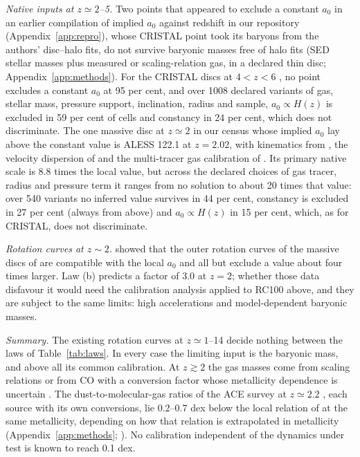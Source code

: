 \documentclass[fleqn,usenatbib]{mnras}
\begin{document}
\emph{Native inputs at $z\simeq2$--5.} Two points that appeared to exclude a constant $a_0$ in an earlier compilation of implied $a_0$ against redshift in our repository (Appendix~\ref{app:repro}), whose CRISTAL point took its baryons from the authors' disc--halo fits, do not survive baryonic masses free of halo fits (SED stellar masses plus measured or scaling-relation gas, in a declared thin disc; Appendix~\ref{app:methods}). For the CRISTAL discs at $4<z<6$ \citep{Lee2025}, no point excludes a constant $a_0$ at 95 per cent, and over 1008 declared variants of gas, stellar mass, pressure support, inclination, radius and sample, $a_0\propto H(z)$ is excluded in 59 per cent of cells and constancy in 24 per cent, which does not discriminate. The one massive disc at $z\simeq2$ in our census whose implied $a_0$ lay above the constant value is ALESS 122.1 at $z=2.02$, with kinematics from \citet{Amvrosiadis2025}, the velocity dispersion of \citet{CalistroRivera2018} and the multi-tracer gas calibration of \citet{Dunne2022}. Its primary native scale is 8.8 times the local value, but across the declared choices of gas tracer, radius and pressure term it ranges from no solution to about 20 times that value: over 540 variants no inferred value survives in 44 per cent, constancy is excluded in 27 per cent (always from above) and $a_0\propto H(z)$ in 15 per cent, which, as for CRISTAL, does not discriminate.

\emph{Rotation curves at $z\sim2$.} \citet{Milgrom2017} showed that the outer rotation curves of the massive discs of \citet{Genzel2017} are compatible with the local $a_0$ and all but exclude a value about four times larger. Law (b) predicts a factor of 3.0 at $z=2$; whether those data disfavour it would need the calibration analysis applied to RC100 above, and they are subject to the same limits: high accelerations and model-dependent baryonic masses.

\emph{Summary.} The existing rotation curves at $z\simeq1$--14 decide nothing between the laws of Table~\ref{tab:laws}. In every case the limiting input is the baryonic mass, and above all its common calibration. At $z\gtrsim2$ the gas masses come from scaling relations \citep{Tacconi2018,Tacconi2020} or from CO with a conversion factor whose metallicity dependence is uncertain \citep{Bolatto2013}. The dust-to-molecular-gas ratios of the ACE survey at $z\simeq2.2$ \citep{Geesink2026}, each source with its own conversions, lie 0.2--0.7 dex below the local relation of \citet{Bertemes2018} at the same metallicity, depending on how that relation is extrapolated in metallicity (Appendix~\ref{app:methods}; \citealt{Zimmerman2026wall}). No calibration independent of the dynamics under test is known to reach 0.1 dex.
\end{document}
